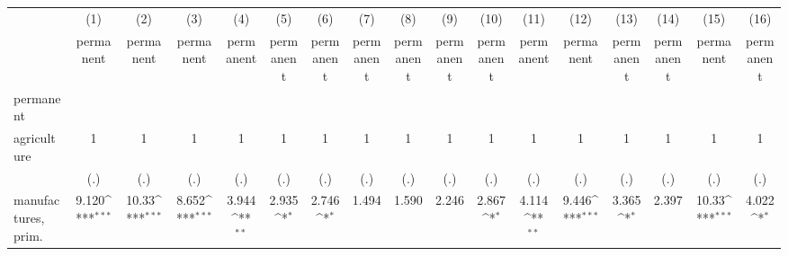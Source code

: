 {
\def\sym#1{\ifmmode^{#1}\else\(^{#1}\)\fi}
\begin{tabular}{l*{16}{c}}
\hline\hline
                    &\multicolumn{1}{c}{(1)}&\multicolumn{1}{c}{(2)}&\multicolumn{1}{c}{(3)}&\multicolumn{1}{c}{(4)}&\multicolumn{1}{c}{(5)}&\multicolumn{1}{c}{(6)}&\multicolumn{1}{c}{(7)}&\multicolumn{1}{c}{(8)}&\multicolumn{1}{c}{(9)}&\multicolumn{1}{c}{(10)}&\multicolumn{1}{c}{(11)}&\multicolumn{1}{c}{(12)}&\multicolumn{1}{c}{(13)}&\multicolumn{1}{c}{(14)}&\multicolumn{1}{c}{(15)}&\multicolumn{1}{c}{(16)}\\
                    &\multicolumn{1}{c}{permanent}&\multicolumn{1}{c}{permanent}&\multicolumn{1}{c}{permanent}&\multicolumn{1}{c}{permanent}&\multicolumn{1}{c}{permanent}&\multicolumn{1}{c}{permanent}&\multicolumn{1}{c}{permanent}&\multicolumn{1}{c}{permanent}&\multicolumn{1}{c}{permanent}&\multicolumn{1}{c}{permanent}&\multicolumn{1}{c}{permanent}&\multicolumn{1}{c}{permanent}&\multicolumn{1}{c}{permanent}&\multicolumn{1}{c}{permanent}&\multicolumn{1}{c}{permanent}&\multicolumn{1}{c}{permanent}\\
\hline
permanent           &                     &                     &                     &                     &                     &                     &                     &                     &                     &                     &                     &                     &                     &                     &                     &                     \\
agriculture         &           1         &           1         &           1         &           1         &           1         &           1         &           1         &           1         &           1         &           1         &           1         &           1         &           1         &           1         &           1         &           1         \\
                    &         (.)         &         (.)         &         (.)         &         (.)         &         (.)         &         (.)         &         (.)         &         (.)         &         (.)         &         (.)         &         (.)         &         (.)         &         (.)         &         (.)         &         (.)         &         (.)         \\
[1em]
manufactures, prim. &       9.120\sym{***}&       10.33\sym{***}&       8.652\sym{***}&       3.944\sym{**} &       2.935\sym{*}  &       2.746\sym{*}  &       1.494         &       1.590         &       2.246         &       2.867\sym{*}  &       4.114\sym{**} &       9.446\sym{***}&       3.365\sym{*}  &       2.397         &       10.33\sym{***}&       4.022\sym{*}  \\

\end{tabular}}
